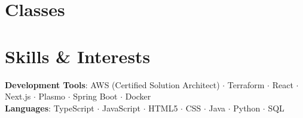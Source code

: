 \documentclass[letterpaper,11pt]{article}
\makeatletter
\newcommand{\resumeItem}[1]{
  \item\small{
    {#1 \vspace{-2pt}}
  }
}
\newcommand{\resumeSubheading}[4]{
  \vspace{-2pt}\item
    \begin{tabular*}{0.97\textwidth}[t]{l@{\extracolsep{\fill}}r}
      \textbf{#1} \textit{#2} & #3 \\
      \textit{\small#4} & \\
    \end{tabular*}\vspace{-7pt}
}
\newcommand{\resumeSubHeadingListEnd}{\end{itemize}}
\newcommand{\resumeItemListStart}{\begin{itemize}[leftmargin=0.15in]} %
\newcommand{\resumeItemListEnd}{\end{itemize}\vspace{-5pt}}
\makeatother
\begin{document}

\section{Classes}


\section{Skills \& Interests}
 \begin{itemize}[leftmargin=0.15in, label={}]
    \small{\item{
    \vspace{1mm}
    \textbf{Development Tools}{: AWS (Certified Solution Architect) {\bfseries\large$\cdot$} Terraform {\bfseries\large$\cdot$} React {\bfseries\large$\cdot$} Next.js {\bfseries\large$\cdot$} Plasmo  {\bfseries\large$\cdot$} Spring Boot {\bfseries\large$\cdot$} Docker } \\
    \vspace{1mm}
    \textbf{Languages}{: TypeScript {\bfseries\large$\cdot$} JavaScript {\bfseries\large$\cdot$} HTML5 {\bfseries\large$\cdot$} CSS {\bfseries\large$\cdot$} Java {\bfseries\large$\cdot$} Python {\bfseries\large$\cdot$} SQL} \\
    \vspace{1mm}

    }}
 \end{itemize}
 \begin{center}
\end{center}
\end{document}
